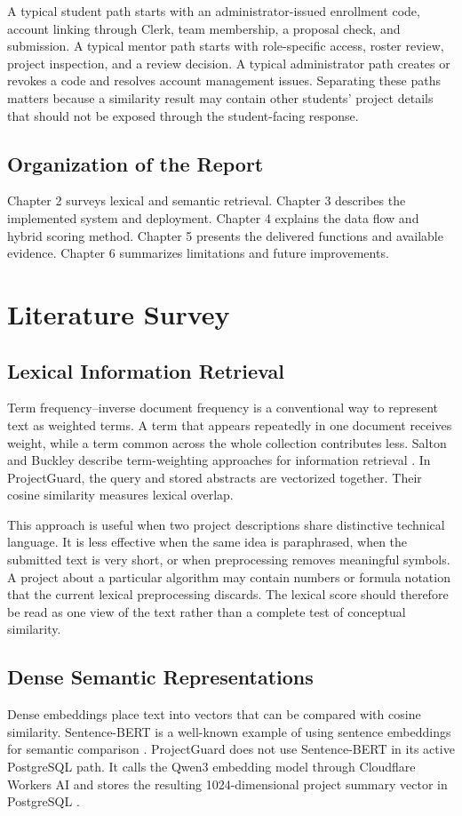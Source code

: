 \documentclass[12pt,a4paper]{report}
\begin{document}
A typical student path starts with an administrator-issued enrollment code, account linking through Clerk, team membership, a proposal check, and submission. A typical mentor path starts with role-specific access, roster review, project inspection, and a review decision. A typical administrator path creates or revokes a code and resolves account management issues. Separating these paths matters because a similarity result may contain other students' project details that should not be exposed through the student-facing response.

\section{Organization of the Report}
Chapter 2 surveys lexical and semantic retrieval. Chapter 3 describes the implemented system and deployment. Chapter 4 explains the data flow and hybrid scoring method. Chapter 5 presents the delivered functions and available evidence. Chapter 6 summarizes limitations and future improvements.

\chapter{Literature Survey}
\section{Lexical Information Retrieval}
Term frequency--inverse document frequency is a conventional way to represent text as weighted terms. A term that appears repeatedly in one document receives weight, while a term common across the whole collection contributes less. Salton and Buckley describe term-weighting approaches for information retrieval \cite{salton1988}. In ProjectGuard, the query and stored abstracts are vectorized together. Their cosine similarity measures lexical overlap.

This approach is useful when two project descriptions share distinctive technical language. It is less effective when the same idea is paraphrased, when the submitted text is very short, or when preprocessing removes meaningful symbols. A project about a particular algorithm may contain numbers or formula notation that the current lexical preprocessing discards. The lexical score should therefore be read as one view of the text rather than a complete test of conceptual similarity.

\section{Dense Semantic Representations}
Dense embeddings place text into vectors that can be compared with cosine similarity. Sentence-BERT is a well-known example of using sentence embeddings for semantic comparison \cite{reimers2019}. ProjectGuard does not use Sentence-BERT in its active PostgreSQL path. It calls the Qwen3 embedding model through Cloudflare Workers AI and stores the resulting 1024-dimensional project summary vector in PostgreSQL \cite{qwen3embedding,cloudflareqwen}.
\end{document}

